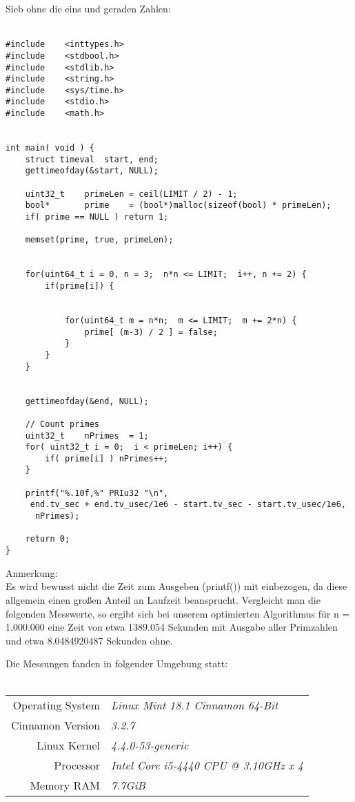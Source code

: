 \documentclass[a4paper,12pt]{article}
\begin{document}
Sieb ohne die eins und geraden Zahlen:\\\\
\begin{verbatim}
#include    <inttypes.h>
#include    <stdbool.h>
#include    <stdlib.h>
#include    <string.h>
#include    <sys/time.h>
#include    <stdio.h>
#include    <math.h>


int main( void ) {
    struct timeval  start, end;
    gettimeofday(&start, NULL);

    uint32_t	primeLen = ceil(LIMIT / 2) - 1;
    bool* 		prime 	 = (bool*)malloc(sizeof(bool) * primeLen);
    if( prime == NULL ) return 1;

    memset(prime, true, primeLen);


    for(uint64_t i = 0, n = 3;  n*n <= LIMIT;  i++, n += 2) {
        if(prime[i]) {


            for(uint64_t m = n*n;  m <= LIMIT;  m += 2*n) {
				prime[ (m-3) / 2 ] = false;
            }
        }
	}


    gettimeofday(&end, NULL);
    
    // Count primes
    uint32_t    nPrimes  = 1;
    for( uint32_t i = 0;  i < primeLen; i++) {
        if( prime[i] ) nPrimes++;
    }   
    
    printf("%.10f,%" PRIu32 "\n", 
     end.tv_sec + end.tv_usec/1e6 - start.tv_sec - start.tv_usec/1e6, 
      nPrimes);
    
	return 0;
}
\end{verbatim}

Anmerkung:\\
Es wird bewusst nicht die Zeit zum Ausgeben (printf()) mit einbezogen, da diese allgemein einen großen Anteil an Laufzeit beansprucht. Vergleicht man die folgenden Messwerte, so ergibt sich bei unserem optimierten Algorithmus für n = 1.000.000 eine Zeit von etwa 1389.054 Sekunden mit Ausgabe aller Primzahlen und etwa 8.0484920487 Sekunden ohne.

Die Messungen fanden in folgender Umgebung statt:\\\\
\begin{tabular}{|r|l|}
\hline
Operating System & \emph{Linux Mint 18.1 Cinnamon 64-Bit}\\
Cinnamon Version & \emph{3.2.7}\\
Linux Kernel & \emph{4.4.0-53-generic}\\
Processor & \emph{Intel Core i5-4440 CPU @ 3.10GHz x 4}\\
Memory RAM & \emph{7.7GiB}\\
\hline
\end{tabular}\\\\
\end{document}
